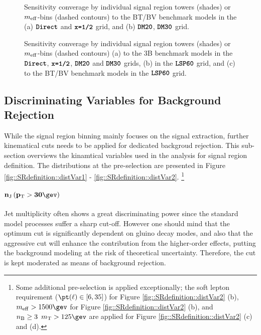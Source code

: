 \begin{figure}[h]
  \centering
    \caption{ 
     Sensitivity converage by individual signal region towers (shades) or $m_{\mathrm{eff}}$-bins (dashed contours) to the BT/BV benchmark models in the
    (a) $\mathrm{\textbf{\texttt{Direct}}}$ and $\mathrm{\textbf{\texttt{x=1/2}}}$ grid, and (b) $\mathrm{\textbf{\texttt{DM20}}}$, $\mathrm{\textbf{\texttt{DM30}}}$ grid. }
    \label{fig::SRdefinition::towerCoverage1}
\end{figure}

\begin{figure}[h]
  \centering
    \caption{ 
     Sensitivity converage by individual signal region towers (shades) or $m_{\mathrm{eff}}$-bins (dashed contours) 
     (a) to the 3B benchmark models in the $\mathrm{\textbf{\texttt{Direct}}}$, $\mathrm{\textbf{\texttt{x=1/2}}}$, $\mathrm{\textbf{\texttt{DM20}}}$ and $\mathrm{\textbf{\texttt{DM30}}}$ grids,
     (b) in the $\mathrm{\textbf{\texttt{LSP60}}}$ grid, and
     (c) to the BT/BV benchmark models in the $\mathrm{\textbf{\texttt{LSP60}}}$ grid.
 }
    \label{fig::SRdefinition::towerCoverage2}
\end{figure}


\clearpage
\subsection{Discriminating Variables for Background Rejection}
While the signal region binning mainly focuses on the signal extraction,
further kinematical cuts needs to be applied for dedicated backgroud rejection.
This sub-section overviews the kinamtical variables used in the analysis for signal region definition. 
The distributions at the pre-selection are presented in Figure \ref{fig::SRdefinition::distVar1} - \ref{fig::SRdefinition::distVar2}. 
\footnote{Some additional pre-selection is applied exceptionally; the soft lepton requirement ($\pt(\ell)\in[6,35]$) for Figure \ref{fig::SRdefinition::distVar2} (b), $\meffInc>1500\gev$ for Figure \ref{fig::SRdefinition::distVar2} (b), and $\nBJetNoGev \geq3 \,\,\, \mt>125\gev$ are applied for Figure \ref{fig::SRdefinition::distVar2} (c) and (d). 
}

\paragraph{${\bf \nJet}$}
Jet multiplicity often shows a great discriminating power since the standard model processes suffer a sharp cut-off.
However one should mind that the optimum cut is significantly dependent on gluino decay modes, and also that the aggressive cut will enhance the contribution from the higher-order effects, putting the background modeling at the risk of theoretical uncertainty.
Therefore, the cut is kept moderated as means of background rejection. 

